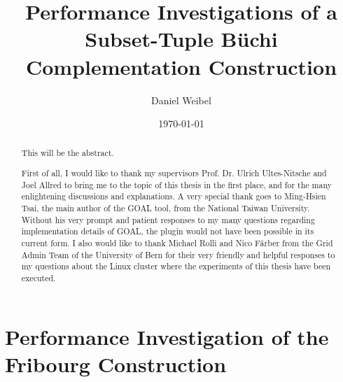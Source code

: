 \documentclass[standard]{styles/thesis}
\title{Performance Investigations of a Subset-Tuple Büchi Complementation Construction}
\author{Daniel Weibel}
\date{\today}
\begin{document}
\maketitle



\begin{abstract}
This will be the abstract.
\end{abstract}

\renewcommand{\abstractname}{Acknowledgements}
\begin{abstract}
First of all, I would like to thank my supervisors Prof. Dr. Ulrich Ultes-Nitsche and Joel Allred to bring me to the topic of this thesis in the first place, and for the many enlightening discussions and explanations. A very special thank goes to Ming-Hsien Tsai, the main author of the GOAL tool, from the National Taiwan University. Without his very prompt and patient responses to my many questions regarding implementation details of GOAL, the plugin would not have been possible in its current form. I also would like to thank Michael Rolli and Nico Färber from the Grid Admin Team of the University of Bern for their very friendly and helpful responses to my questions about the Linux cluster where the experiments of this thesis have been executed.
\end{abstract}

\dominitoc
\tableofcontents

% 

% 

% 

\chapter{Performance Investigation of the Fribourg Construction}
\label{chap_investigation}
\minitoc
\newpage

\end{document}
